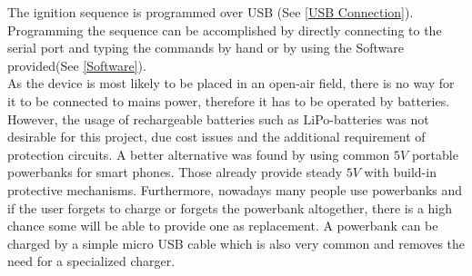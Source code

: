 \noindent The ignition sequence is programmed over USB (See \cref{USB Connection}). Programming the sequence can be accomplished by directly connecting to the serial port and typing the commands by hand or by using the Software provided(See \cref{Software}).\\

\noindent As the device is most likely to be placed in an open-air field, there is no way for it to be connected to mains power, therefore it has to be operated by batteries. However, the usage of rechargeable batteries such as LiPo-batteries was not desirable for this project, due cost issues and the additional requirement of protection circuits. A better alternative was found by using common $5V$ portable powerbanks for smart phones. Those already provide steady $5V$ with build-in protective mechanisms. Furthermore, nowadays many people use powerbanks and if the user forgets to charge or forgets the powerbank altogether, there is a high chance some will be able to provide one as replacement. A powerbank can be charged by a simple micro USB cable which is also very common and removes the need for a specialized charger.





\pagebreak